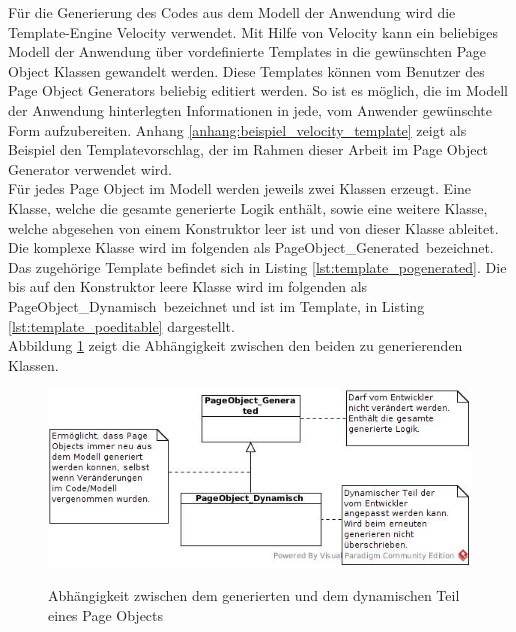 Für die Generierung des Codes aus dem Modell der Anwendung wird die Template-Engine Velocity \cite{apache_software_foundation_apache_2015} verwendet.
Mit Hilfe von Velocity kann ein beliebiges Modell der Anwendung über vordefinierte Templates in die gewünschten Page Object Klassen gewandelt werden.
Diese Templates können vom Benutzer des Page Object Generators beliebig editiert werden. So ist es möglich, die im Modell der Anwendung hinterlegten Informationen in jede, vom Anwender gewünschte Form aufzubereiten. Anhang \ref{anhang:beispiel_velocity_template} zeigt als Beispiel den Templatevorschlag, der im Rahmen dieser Arbeit im Page Object Generator verwendet wird.\\
Für jedes Page Object im Modell werden jeweils zwei Klassen erzeugt. Eine Klasse, welche die gesamte generierte Logik enthält, sowie eine weitere Klasse, welche abgesehen von einem Konstruktor leer ist und von dieser Klasse ableitet. 
Die komplexe Klasse wird im folgenden als \grq PageObject\_Generated\grq\ bezeichnet. Das zugehörige Template befindet sich in Listing \ref{lst:template_pogenerated}. Die
bis auf den Konstruktor leere Klasse wird im folgenden als \grq PageObject\_Dynamisch\grq\ bezeichnet und ist im Template, in Listing \ref{lst:template_poeditable} dargestellt.\\
Abbildung \ref{fig:postruktur} zeigt die Abhängigkeit zwischen den beiden zu generierenden Klassen.

\begin{figure}[htb]
  \centering  
  \includegraphics[scale=0.6]{img/postruktur.jpg}\\
  \caption{Abhängigkeit zwischen dem generierten und dem dynamischen Teil eines Page Objects}
  \label{fig:postruktur}
\end{figure}
 
